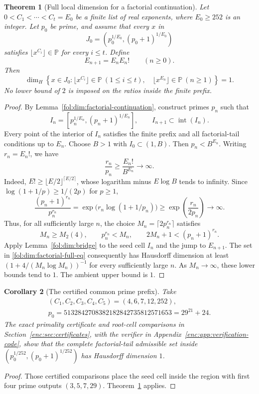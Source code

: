 \documentclass[11pt,a4paper]{article}
\newtheorem{theorem}{Theorem}[section]
\newtheorem{corollary}[theorem]{Corollary}
\theoremstyle{definition}
\theoremstyle{remark}
\numberwithin{equation}{section}
\begin{document}
\begin{theorem}[Full local dimension for a factorial continuation]
\label{fol:dim:factorial-full}
Let $0<C_1<\cdots<C_t=E_0$ be a finite list of real exponents, where
$E_0\ge252$ is an integer.  Let $p_0$ be prime, and assume that every
$x$ in
\[
 J_0=(p_0^{1/E_0},(p_0+1)^{1/E_0})
\]
satisfies $\lfloor x^{C_i}\rfloor\in\mathbb P$ for every $i\le t$.
Define
\[
 E_{n+1}=E_n E_n!\qquad(n\ge0).
\]
Then
\begin{equation}\label{fol:dim:factorial-full-eq}
 \dim_H\left\{x\in J_0:
   \lfloor x^{C_i}\rfloor\in\mathbb P\ (1\le i\le t),\quad
   \lfloor x^{E_n}\rfloor\in\mathbb P\ (n\ge1)\right\}=1.
\end{equation}
No lower bound of $2$ is imposed on the ratios inside the finite prefix.
\end{theorem}
\begin{proof}
By Lemma~\ref{fol:dim:factorial-continuation}, construct primes $p_n$ such that
\[
 I_n=[p_n^{1/E_n},(p_n+1)^{1/E_n}],\qquad
 I_{n+1}\subset\operatorname{int}(I_n).
\]
Every point of the interior of $I_n$ satisfies the finite prefix and all
factorial-tail conditions up to $E_n$.  Choose $B>1$ with $I_0\subset(1,B)$.
Then $p_n<B^{E_n}$.  Writing $r_n=E_n!$, we have
\[
 \frac{r_n}{p_n}\ge\frac{E_n!}{B^{E_n}}\longrightarrow\infty.
\]
Indeed, $E!\ge\lfloor E/2\rfloor^{\lceil E/2\rceil}$, whose logarithm
minus $E\log B$ tends to infinity.  Since
$\log(1+1/p)\ge1/(2p)$ for $p\ge1$,
\[
 \frac{(p_n+1)^{r_n}}{p_n^{r_n}}
 =\exp\bigl(r_n\log(1+1/p_n)\bigr)
 \ge\exp\left(\frac{r_n}{2p_n}\right)\longrightarrow\infty.
\]
Thus, for all sufficiently large $n$, the choice
$M_n=\lceil2p_n^{r_n}\rceil$ satisfies
\[
 M_n\ge M_2(4),\qquad p_n^{r_n}<M_n,\qquad
 2M_n+1<(p_n+1)^{r_n}.
\]
Apply Lemma~\ref{fol:dim:bridge} to the seed cell $I_n$ and the jump to
$E_{n+1}$.  The set in \eqref{fol:dim:factorial-full-eq} consequently has
Hausdorff dimension at least
$(1+4/(M_n\log M_n))^{-1}$ for every sufficiently large $n$.
As $M_n\to\infty$, these lower bounds tend to $1$.  The ambient upper
bound is $1$.
\end{proof}

\begin{corollary}[The certified common prime prefix]
\label{fol:dim:original-seed}
Take
\[
 \begin{gathered}
 (C_1,C_2,C_3,C_4,C_5)=(4,6,7,12,252),\\
 p_0=5132842708382182842735812571653=29^{21}+24.
 \end{gathered}
\]
The exact primality certificate and root-cell comparisons in
Section~\ref{enc:sec:certificates}, with the verifier in
Appendix~\ref{enc:app:verification-code}, show that the complete factorial-tail admissible set
inside $(p_0^{1/252},(p_0+1)^{1/252})$ has Hausdorff dimension $1$.
\end{corollary}
\begin{proof}
Those certified comparisons place the seed cell inside the region with first four
prime outputs $(3,5,7,29)$.  Theorem~\ref{fol:dim:factorial-full} applies.
\end{proof}
\end{document}

